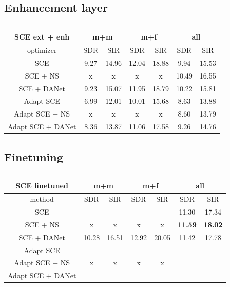 \documentclass[master, tikz, final,11pt, dvipdfmx]{iscs-thesis}
\begin{document}
\subsection{Enhancement layer}
\label{enh}

\begin{table}[h]
\begin{tabular}{c|c|c|c|c|c|c}
SCE ext + enh & \multicolumn{2}{c|}{m+m} & \multicolumn{2}{c|}{m+f} & \multicolumn{2}{c}{all} \\ 
\hline 
optimizer & SDR & SIR & SDR & SIR & SDR & SIR \\ 
\hline
SCE  & 9.27 & 14.96 & 12.04 & 18.88 & 9.94 & 15.53 \\ 
SCE + NS & x & x & x & x & 10.49 & 16.55 \\ 
SCE + DANet  & 9.23 & 15.07 & 11.95 & 18.79 & 10.22 & 15.81 \\ 
\hline 
\hline 
Adapt SCE  & 6.99 & 12.01 & 10.01 & 15.68 & 8.63 & 13.88 \\ 
Adapt SCE + NS & x & x & x & x & 8.60 & 13.79 \\ 
Adapt SCE + DANet  & 8.36 & 13.87 & 11.06 & 17.58 & 9.26 & 14.76 \\ 

\end{tabular}
\captionsetup{justification=centering}
\caption{}
\label{table:SCE400enh}
\end{table}

\subsection{Finetuning}
\label{finetuning}


\begin{table}[h]
\begin{tabular}{c|c|c|c|c|c|c}
SCE finetuned & \multicolumn{2}{c|}{m+m} & \multicolumn{2}{c|}{m+f} & \multicolumn{2}{c}{all} \\ 
\hline 
method & SDR & SIR & SDR & SIR & SDR & SIR \\ 
\hline
SCE  & - & - & & & 11.30 & 17.34 \\ 
SCE + NS & x & x & x & x & \textbf{11.59} & \textbf{18.02} \\ 
SCE + DANet  & 10.28 & 16.51 & 12.92 & 20.05 & 11.42 & 17.78 \\ 
\hline 
\hline 
Adapt SCE  &  & &  & & &  \\ 
Adapt SCE + NS & x & x & x & x & & \\ 
Adapt SCE + DANet  & & & & & & \\ 

\end{tabular}
\captionsetup{justification=centering}
\caption{}
\label{table:SCE400enh}
\end{table}
\end{document}
